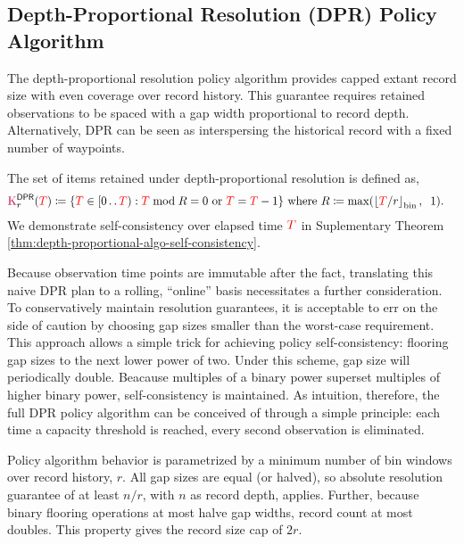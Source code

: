 \subsection{Depth-Proportional Resolution (DPR) Policy Algorithm}
\label{sec:depth-proportional-resolution-algo}

The depth-proportional resolution policy algorithm provides capped extant record size with even coverage over record history.
This guarantee requires retained observations to be spaced with a gap width proportional to record depth.
Alternatively, DPR can be seen as interspersing the historical record with a fixed number of waypoints.

The set of items retained under depth-proportional resolution is defined as,
\begin{align}
\colorK^{\mathsf{DPR}}_r(\colorT)
&\coloneq \{
\colorTbar \in [0\twodots\colorT)
: \colorTbar \bmod R = 0 \text{ or } \colorTbar = \colorT - 1
\}
\text{ where }
R \coloneq \max(\left \lfloor \colorT / r \right \rfloor_{\mathrm{bin}}, \;\; 1).
\label{eqn:dpr_kept}
\end{align}
We demonstrate self-consistency over elapsed time $\colorT$ in Suplementary Theorem \ref{thm:depth-proportional-algo-self-consistency}.

Because observation time points are immutable after the fact, translating this naive DPR plan to a rolling, ``online'' basis necessitates a further consideration.
To conservatively maintain resolution guarantees, it is acceptable to err on the side of caution by choosing gap sizes smaller than the worst-case requirement.
This approach allows a simple trick for achieving policy self-consistency: flooring gap sizes to the next lower power of two.
Under this scheme, gap size will periodically double.
Beacause multiples of a binary power superset multiples of higher binary power, self-consistency is maintained.
As intuition, therefore, the full DPR policy algorithm can be conceived of through a simple principle: %
each time a capacity threshold is reached, every second observation is eliminated.

Policy algorithm behavior is parametrized by a minimum number of bin windows over record history, $r$.
All gap sizes are equal (or halved), so absolute resolution guarantee of at least $n/r$, with $n$ as record depth, applies.
Further, because binary flooring operations at most halve gap widths, record count at most doubles.
This property gives the record size cap of $2r$.

